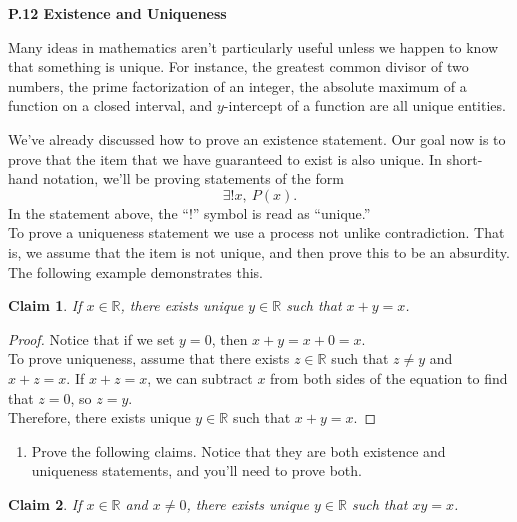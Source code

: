 \documentclass[12 pt]{article}
\newcommand{\R}{\mathbb{R}}
\theoremstyle{definition}
\theoremstyle{plain}
\theoremstyle{mytheorem}
\theoremstyle{myexample}
\newtheorem{claim}{Claim}
\theoremstyle{mydefinition}
\begin{document}
\begin{center}
\textbf{P.12 Existence and Uniqueness}
\end{center}

Many ideas in mathematics aren't particularly useful unless we happen to know that something is unique.  For instance, the greatest common divisor of two numbers, the prime factorization of an integer, the absolute maximum of a function on a closed interval, and $y$-intercept of a function are all unique entities.  
\begin{center}
\end{center}

\noindent We've already discussed how to prove an existence statement.  Our goal now is to prove that the item that we have guaranteed to exist is also unique.  In short-hand notation, we'll be proving statements of the form
\[\exists ! x, \ P(x).\]
In the statement above, the ``!'' symbol is read as ``unique.''\\

\noindent  To prove a uniqueness statement we use a process not unlike contradiction.  That is, we assume that the item is not unique, and then prove this to be an absurdity.  The following example demonstrates this.

\begin{claim}  If $x \in \R$, there exists unique $y\in \R$ such that $x+y=x$.
\end{claim}

\begin{proof}  Notice that if we set $y=0$, then $x+y=x+0=x$.\\

To prove uniqueness, assume that there exists $z \in \R$ such that $z \neq y$ and $x+z=x$.  If $x+z=x$, we can subtract $x$ from both sides of the equation to find that $z=0$, so $z=y$.  \\

Therefore, there exists unique $y \in \R$ such that $x+y = x$.
\end{proof}

\begin{enumerate}
\item Prove the following claims.  Notice that they are both existence and uniqueness statements, and you'll need to prove both.
\end{enumerate}
\begin{claim}  If $x \in \R$ and $x \neq 0$, there exists unique $y \in \R$ such that $xy=x$.
\end{claim}
\end{document}

